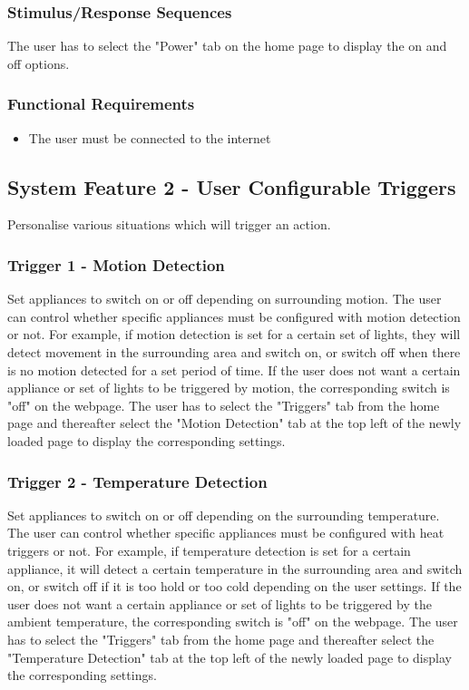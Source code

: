 \documentclass[11pt, a4paper]{article}
\newcounter{subsubsubsection}[subsubsection]
\begin{document}
	\subsubsection{Stimulus/Response Sequences}
	The user has to select the "Power" tab on the home page to display the on and off options. 
	\subsubsection{Functional Requirements}
	\begin{itemize}
		\item The user must be connected to the internet
	\end{itemize}
	
	\subsection{System Feature 2 - User Configurable Triggers} 
	Personalise various situations which will trigger an action.
	\subsubsection{Trigger 1 - Motion Detection}
	Set appliances to switch on or off depending on surrounding motion. 
	The user can control whether specific appliances must be configured with motion detection or not. For example, if motion detection is set for a certain set of lights, they will detect movement in the surrounding area and switch on, or switch off when there is no motion detected for a set period of time. If the user does not want a certain appliance or set of lights to be triggered by motion, the corresponding switch is "off" on the webpage. 
	The user has to select the "Triggers" tab from the home page and thereafter select the "Motion Detection" tab at the top left of the newly loaded page to display the corresponding settings.
	\subsubsection{Trigger 2 - Temperature Detection}
	Set appliances to switch on or off depending on the surrounding temperature.
	The user can control whether specific appliances must be configured with heat triggers or not. For example, if temperature detection is set for a certain appliance, it will detect a certain temperature in the surrounding area and switch on, or switch off if it is too hold or too cold depending on the user settings. If the user does not want a certain appliance or set of lights to be triggered by the ambient temperature, the corresponding switch is "off" on the webpage. 
	The user has to select the "Triggers" tab from the home page and thereafter select the "Temperature Detection" tab at the top left of the newly loaded page to display the corresponding settings.
\end{document}
